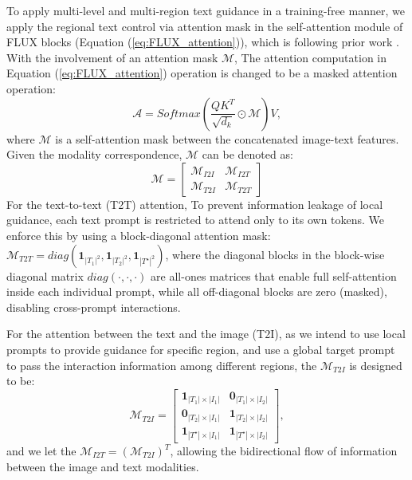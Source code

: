 \documentclass{article}
\begin{document}
To apply multi-level and multi-region text guidance in a training-free manner, we apply the regional text control via attention mask in  the self-attention module of FLUX blocks (Equation (\ref{eq:FLUX_attention})), which is following prior work \citep{chen2024training}. With the involvement of an attention mask $\mathcal{M}$, The attention computation in Equation (\ref{eq:FLUX_attention}) operation is changed to be a masked attention operation:
\begin{equation*}
\mathcal{A} = Softmax(\frac{QK^T}{\sqrt{d_k}} \odot \mathcal{M})V,
\label{eq:masked_attention}
\end{equation*}
where $\mathcal{M}$ is a self-attention mask between the concatenated image-text features. Given the modality correspondence, $ \mathcal{M}$ can be denoted as:
\begin{equation*}
    \mathcal{M} = \begin{bmatrix}
        \mathcal{M}_{I2I} &  \mathcal{M}_{I2T} \\
        \mathcal{M}_{T2I} &  \mathcal{M}_{T2T}
    \end{bmatrix}
\end{equation*}
For the text-to-text (T2T) attention, To prevent information leakage of local guidance, each text prompt is restricted to attend only to its own tokens. We enforce this by using a block-diagonal attention mask: $\mathcal{M}_{T2T}=diag(\mathbf{1}_{|T_1|^2}, \mathbf{1}_{|T_2|^2},\mathbf{1}_{|T^\star|^2})$, where the diagonal blocks  in the block-wise diagonal matrix $diag(\cdot,\cdot,\cdot)$ are all-ones matrices that enable full self-attention inside each individual prompt, while all off-diagonal blocks are zero (masked), disabling cross-prompt interactions.


For the attention between the text and the image (T2I), as we intend to use local prompts to provide guidance for specific region, and use a global target prompt to pass the interaction information among different regions, the $\mathcal{M}_{T2I}$ is designed to be:
\begin{equation*}
    \mathcal{M}_{T2I} = \begin{bmatrix}
        \mathbf{1}_{|T_1|\times|I_1|} &  \mathbf{0}_{|T_1|\times|I_2|}\\
        \mathbf{0}_{|T_2|\times|I_1|} &  \mathbf{1}_{|T_2|\times|I_2|}\\
         \mathbf{1}_{|T^\star|\times|I_1|} &  \mathbf{1}_{|T^\star|\times|I_2|}
    \end{bmatrix},
\end{equation*}
and we let the $\mathcal{M}_{I2T}=(\mathcal{M}_{T2I})^T$, allowing the bidirectional flow of information between the image and text modalities.
\end{document}
